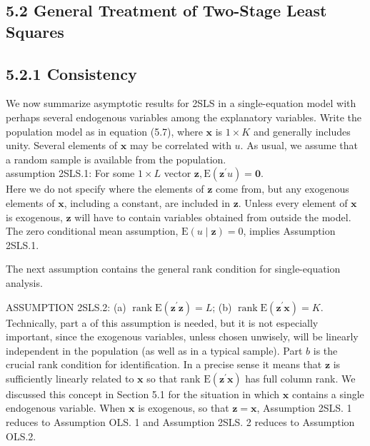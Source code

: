\documentclass[10pt]{article}
\begin{document}
\subsection*{5.2 General Treatment of Two-Stage Least Squares}
\subsection*{5.2.1 Consistency}
We now summarize asymptotic results for 2SLS in a single-equation model with perhaps several endogenous variables among the explanatory variables. Write the\\
population model as in equation (5.7), where $\mathbf{x}$ is $1 \times K$ and generally includes unity. Several elements of $\mathbf{x}$ may be correlated with $u$. As usual, we assume that a random sample is available from the population.\\
assumption 2SLS.1: For some $1 \times L$ vector $\mathbf{z}, \mathrm{E}\left(\mathbf{z}^{\prime} u\right)=\mathbf{0}$.\\
Here we do not specify where the elements of $\mathbf{z}$ come from, but any exogenous elements of $\mathbf{x}$, including a constant, are included in $\mathbf{z}$. Unless every element of $\mathbf{x}$ is exogenous, $\mathbf{z}$ will have to contain variables obtained from outside the model. The zero conditional mean assumption, $\mathrm{E}(u \mid \mathbf{z})=0$, implies Assumption 2SLS.1.

The next assumption contains the general rank condition for single-equation analysis.

ASSUMPTION 2SLS.2: (a) $\operatorname{rank} \mathrm{E}\left(\mathbf{z}^{\prime} \mathbf{z}\right)=L$; (b) $\operatorname{rank} \mathrm{E}\left(\mathbf{z}^{\prime} \mathbf{x}\right)=K$.\\
Technically, part a of this assumption is needed, but it is not especially important, since the exogenous variables, unless chosen unwisely, will be linearly independent in the population (as well as in a typical sample). Part $b$ is the crucial rank condition for identification. In a precise sense it means that $\mathbf{z}$ is sufficiently linearly related to $\mathbf{x}$ so that rank $\mathrm{E}\left(\mathbf{z}^{\prime} \mathbf{x}\right)$ has full column rank. We discussed this concept in Section 5.1 for the situation in which $\mathbf{x}$ contains a single endogenous variable. When $\mathbf{x}$ is exogenous, so that $\mathbf{z}=\mathbf{x}$, Assumption 2SLS. 1 reduces to Assumption OLS. 1 and Assumption 2SLS. 2 reduces to Assumption OLS.2.
\end{document}
